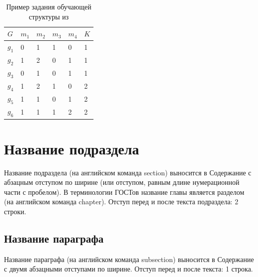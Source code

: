 \begin{refsection}
	
	\begin{table} [htbp]%
		\centering
		\caption{Пример задания обучающей структуры из \cite{Peskov2004}}%
		\label{tab-ToyCompare-Peskov}		\begin{SingleSpace}
			\begin{tabular}{|l|l|l|l|l|l|}
				\hline
				$G$&$m_1$&$m_2$&$m_3$&$m_4$&$K$\\
				\hline
				$g_1$&0&1&1&0&1\\
				$g_2$&1&2&0&1&1\\
				$g_3$&0&1&0&1&1\\
				$g_4$&1&2&1&0&2\\
				$g_5$&1&1&0&1&2\\
				$g_6$&1&1&1&2&2\\
				\hline		
			\end{tabular}	
		\end{SingleSpace}
	\end{table}
		
	
	
	
	\section{Название подраздела} \label{sect1_3} %
	
	
	
	Название подраздела (на английском команда section) выносится в Содержание с абзацным отступом по ширине (или отступом, равным длине нумерационной части с пробелом). В терминологии ГОСТов название главы является разделом (на английском команда chapter). Отступ перед и после текста подраздела: 2 строки.
	
	

	
	\subsection{Название параграфа} \label{sect1_3_1} %
	
	
	Название параграфа (на английском команда subsection)  выносится в Содержание с двумя абзацными отступами по ширине. Отступ перед и после текста: 1 строка. 
	

\end{refsection}
